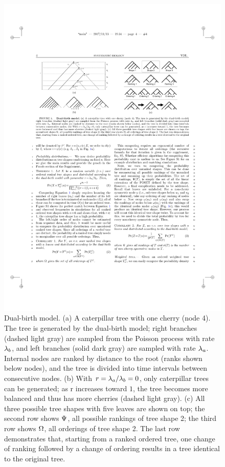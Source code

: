 \begin{figure} %
\centering
\includegraphics[width=\textwidth]{figs/dualbirth-model}
\caption[Dual-Birth Model]
{Dual-birth model. (a) A caterpillar tree with one cherry (node 4). The tree is generated by the dual-birth model; right branches (dashed light gray) are sampled from the Poisson process with rate $\lambda_b$, and left branches (solid dark gray) are sampled with rate $\lambda_a$. Internal nodes are ranked by distance to the root (ranks shown below nodes), and the tree is divided into time intervals between consecutive nodes. (b) With $r=\lambda_a/\lambda_b=0$, only caterpillar trees can be generated; as r increases toward $1$, the tree becomes more balanced and thus has more cherries (dashed light gray). (c) All three possible tree shapes with five leaves are shown on top; the second row shows $\Psi$, all possible rankings of tree shape 2; the third row shows $\Omega$, all orderings of tree shape 2. The last row demonstrates that, starting from a ranked ordered tree, one change of ranking followed by a change of ordering results in a tree identical to the original tree.}
\label{fig:dualbirth-model}
\end{figure}

